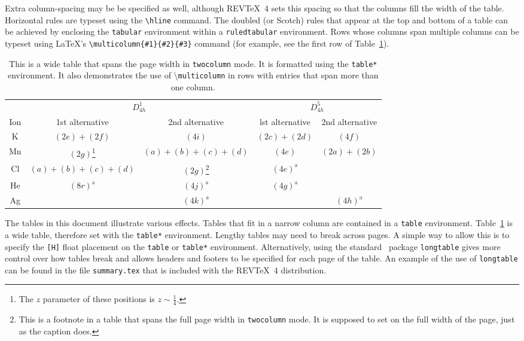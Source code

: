 \documentclass[%
 aip,
 amsmath,amssymb,
 reprint,%
]{revtex4-2}
\begin{document}
Extra column-spacing may be be specified as well, although
REV\TeX~4 sets this spacing so that the columns fill the width of the
table.
Horizontal rules are typeset using the \verb+\hline+
command.
The doubled (or Scotch) rules that appear at the top and
bottom of a table can be achieved by enclosing the \texttt{tabular}
environment within a \texttt{ruledtabular} environment.
Rows whose columns span multiple columns can be typeset using \LaTeX's
\verb+\multicolumn{#1}{#2}{#3}+ command
(for example, see the first row of Table~\ref{tab:table3}).%
\begin{table}
\caption{\label{tab:table3}This is a wide table that spans the page
width in \texttt{twocolumn} mode. It is formatted using the
\texttt{table*} environment. It also demonstrates the use of
\textbackslash\texttt{multicolumn} in rows with entries that span
more than one column.}
\begin{ruledtabular}
\begin{tabular}{ccccc}
 &\multicolumn{2}{c}{$D_{4h}^1$}&\multicolumn{2}{c}{$D_{4h}^5$}\\
 Ion&1st alternative&2nd alternative&lst alternative
&2nd alternative\\ \hline
 K&$(2e)+(2f)$&$(4i)$ &$(2c)+(2d)$&$(4f)$ \\
 Mn&$(2g)$\footnote{The $z$ parameter of these positions is $z\sim\frac{1}{4}$.}
 &$(a)+(b)+(c)+(d)$&$(4e)$&$(2a)+(2b)$\\
 Cl&$(a)+(b)+(c)+(d)$&$(2g)$\footnote{This is a footnote in a table that spans the full page
width in \texttt{twocolumn} mode. It is supposed to set on the full width of the page, just as the caption does. }
 &$(4e)^{\text{a}}$\\
 He&$(8r)^{\text{a}}$&$(4j)^{\text{a}}$&$(4g)^{\text{a}}$\\
 Ag& &$(4k)^{\text{a}}$& &$(4h)^{\text{a}}$\\
\end{tabular}
\end{ruledtabular}
\end{table}

The tables in this document illustrate various effects.
Tables that fit in a narrow column are contained in a \texttt{table}
environment.
Table~\ref{tab:table3} is a wide table, therefore set with the
\texttt{table*} environment.
Lengthy tables may need to break across pages.
A simple way to allow this is to specify
the \verb+[H]+ float placement on the \texttt{table} or
\texttt{table*} environment.
Alternatively, using the standard \LaTeXe\ package \texttt{longtable} 
gives more control over how tables break and allows headers and footers 
to be specified for each page of the table.
An example of the use of \texttt{longtable} can be found
in the file \texttt{summary.tex} that is included with the REV\TeX~4
distribution.
\end{document}
